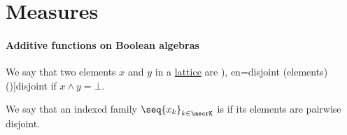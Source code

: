 \section{Measures}\label{sec:measures}

\paragraph{Additive functions on Boolean algebras}

\begin{definition}\label{def:disjoint_lattice_elements}
  We say that two elements \( x \) and \( y \) in a \hyperref[def:lattice]{lattice} are \term[ru=дизъюнктные (элементы) (\cite[18]{Владимиров1969БулевыАлгебры}), en=disjoint (elements) (\cite[45]{Birkhoff1967Lattices})]{disjoint} if \( x \wedge y = \bot \).

  We say that an indexed family \( \seq{ x_k }_{k \in \mscrK} \) is  if its elements are pairwise disjoint.
\end{definition}

